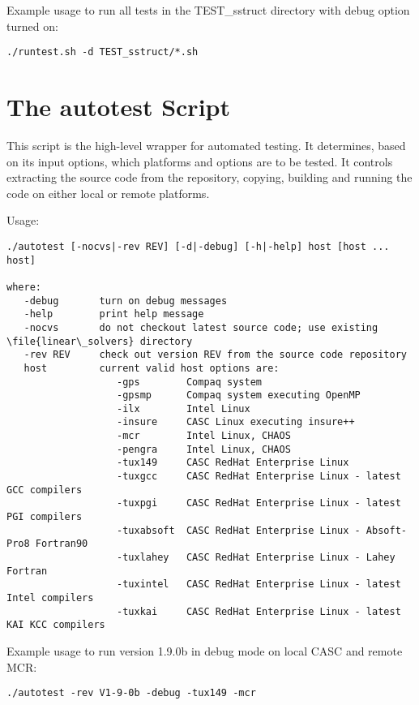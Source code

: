 Example usage to run all tests in the TEST\_sstruct directory with debug option turned on:
\begin{verbatim}
./runtest.sh -d TEST_sstruct/*.sh
\end{verbatim}

\section{The autotest Script}
\label{The autotest Script}

This script is the high-level wrapper for automated testing.  It determines, based 
on its input options, which platforms and options are to be tested.  It controls
extracting the source code from the repository, copying, building and running the
code on either local or remote platforms.

Usage:
\begin{verbatim}
./autotest [-nocvs|-rev REV] [-d|-debug] [-h|-help] host [host ... host]

where:
   -debug       turn on debug messages
   -help        print help message
   -nocvs       do not checkout latest source code; use existing \file{linear\_solvers} directory
   -rev REV     check out version REV from the source code repository
   host         current valid host options are:
                   -gps        Compaq system
                   -gpsmp      Compaq system executing OpenMP
                   -ilx        Intel Linux
                   -insure     CASC Linux executing insure++
                   -mcr        Intel Linux, CHAOS
                   -pengra     Intel Linux, CHAOS
                   -tux149     CASC RedHat Enterprise Linux
                   -tuxgcc     CASC RedHat Enterprise Linux - latest GCC compilers
                   -tuxpgi     CASC RedHat Enterprise Linux - latest PGI compilers
                   -tuxabsoft  CASC RedHat Enterprise Linux - Absoft-Pro8 Fortran90
                   -tuxlahey   CASC RedHat Enterprise Linux - Lahey Fortran
                   -tuxintel   CASC RedHat Enterprise Linux - latest Intel compilers
                   -tuxkai     CASC RedHat Enterprise Linux - latest KAI KCC compilers
\end{verbatim}

Example usage to run version 1.9.0b in debug mode on local CASC and remote MCR:
\begin{verbatim}
./autotest -rev V1-9-0b -debug -tux149 -mcr
\end{verbatim}
